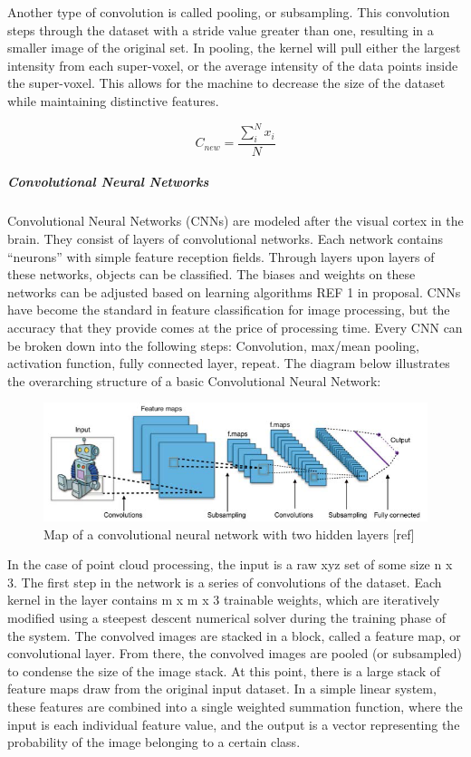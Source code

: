 \documentclass[12pt]{drexelthesis}
\begin{document}
Another type of convolution is called pooling, or subsampling. This convolution steps through the dataset with a stride value greater than one, resulting in a smaller image of the original set. In pooling, the kernel will pull either the largest intensity from each super-voxel, or the average intensity of the data points inside the super-voxel. This allows for the machine to decrease the size of the dataset while maintaining distinctive features.

\begin{equation}
	C_{new} = \frac{\sum_{i}^{N}  x_{i}}{N}
\end{equation}

\subparagraph{Convolutional Neural Networks}
Convolutional Neural Networks (CNNs) are modeled after the visual cortex in the brain. They consist of layers of convolutional networks. Each network contains “neurons” with simple feature reception fields. Through layers upon layers of these networks, objects can be classified. The biases and weights on these networks can be adjusted based on learning algorithms REF 1 in proposal. CNNs have become the standard in feature classification for image processing, but the accuracy that they provide comes at the price of processing time. 
Every CNN can be broken down into the following steps: Convolution, max/mean pooling, activation function, fully connected layer, repeat. The diagram below illustrates the overarching structure of a basic Convolutional Neural Network:
\begin{figure}[!ht]
	\centering
		\includegraphics[width=6in]{cnn.png}
	\caption[High level flow chart of a convolutional neural network]{\centering Map of a convolutional neural network with two hidden layers [ref]}
\end{figure}

In the case of point cloud processing, the input is a raw xyz set of some size n x 3. The first step in the network is a series of convolutions of the dataset. Each kernel in the layer contains m x m x 3 trainable weights, which are iteratively modified using a steepest descent numerical solver during the training phase of the system. The convolved images are stacked in a block, called a feature map, or convolutional layer. From there, the convolved images are pooled (or subsampled) to condense the size of the image stack. 
At this point, there is a large stack of feature maps draw from the original input dataset. In a simple linear system, these features are combined into a single weighted summation function, where the input is each individual feature value, and the output is a vector representing the probability of the image belonging to a certain class.
\end{document}
